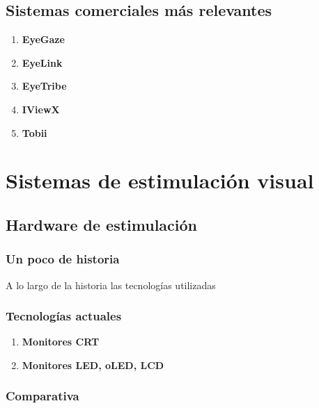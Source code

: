 \documentclass[../main.tex]{subfiles}
\begin{document}
		\subsection{Sistemas comerciales más relevantes}
		\label{sub:02_sistemas_comerciales_más_relevantes}
			\begin{enumerate}
				\item \textbf{EyeGaze}

				\item \textbf{EyeLink}

				\item \textbf{EyeTribe}

				\item \textbf{IViewX}

				\item \textbf{Tobii}

			\end{enumerate}

	\section{Sistemas de estimulación visual}
	\label{sec:02_sistemas_de_estimulacion_visual}
		\subsection{Hardware de estimulación}
		\label{sub:02_hardware_de_estimulacion}
			\subsubsection{Un poco de historia} 
			\label{ssub:02_un_poco_de_historia_monitores}

			A lo largo de la historia las tecnologías utilizadas 

			\subsubsection{Tecnologías actuales} 
			\label{ssub:02_tecnologias_actuales}
				\begin{enumerate}
					\item \textbf{Monitores CRT}

					\item \textbf{Monitores LED, oLED, LCD}

				\end{enumerate}

			\subsubsection{Comparativa}
			\label{ssub:02_comparativa_monitores}
			
\end{document}
